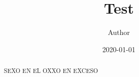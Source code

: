 \documentclass{article}
\title{Test}
\author{Author}
\date{2020-01-01}
\begin{document}
\maketitle

\begin{abstract}
	SEXO EN EL OXXO EN EXCESO
\end{abstract}
\end{document}
